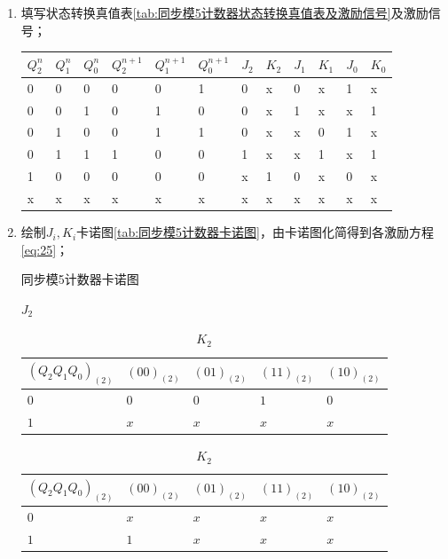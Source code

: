 \documentclass{ctexrep}
\begin{document}
\begin{enumerate}
	\item 填写状态转换真值表\ref{tab:同步模5计数器状态转换真值表及激励信号}及激励信号；

		\begin{table}[htbp]
			\centering
			\caption{同步模5计数器状态转换真值表及激励信号}
			\label{tab:同步模5计数器状态转换真值表及激励信号}
			\begin{longtabu}to
				\toprule
				$ Q^n_2 $ & $ Q^n_1 $ & $ Q^n_0 $ & $ Q^{n+1}_2 $ & $ Q^{n+1}_1 $ & $ Q^{n+1}_0 $ & $ J_2 $ & $ K_2 $ & $ J_1 $ & $ K_1 $ & $ J_0 $ & $ K_0 $ \\
				 & 0 & 0 & 0 & 0 & 1 & 0 & x & 0 & x & 1 & x\\
				0 & 0 & 1 & 0 & 1 & 0 & 0 & x & 1 & x & x & 1\\
				0 & 1 & 0 & 0 & 1 & 1 & 0 & x & x & 0 & 1 & x\\
				0 & 1 & 1 & 1 & 0 & 0 & 1 & x & x & 1 & x & 1\\
				1 & 0 & 0 & 0 & 0 & 0 & x & 1 & 0 & x & 0 & x\\
				x & x & x & x & x & x & x & x & x & x & x & x\\
				\bottomrule
			\end{longtabu}
		\end{table}

	\item 绘制$ J_i,K_i $卡诺图\ref{tab:同步模5计数器卡诺图}，由卡诺图化简得到各激励方程\ref{eq:25}；

		\begin{table}[htbp]
			\centering
			\caption{同步模5计数器卡诺图}
			\label{tab:同步模5计数器卡诺图}
			\begin{subtable}[htbp]{.45\linewidth}
				\centering
				\caption{$ J_2 $}
				\label{tab:J2}
				\begin{tabu}to
					$(Q_2Q_1Q_0)_{(2)}$& $(00)_{(2)}$ & $(01)_{(2)}$ & $(11)_{(2)}$ & $(10)_{(2)}$ \\
					\hline
					$0$ & $0$ & $0$ & $1$ & $0$ \\
					$1$ & $x$ & $x$ & $x$ & $x$ \\
				\end{tabu}
			\end{subtable}
			\quad
			\begin{subtable}[htbp]{.45\linewidth}
				\centering
				\caption{$ K_2 $}
				\label{tab:K2}
				\begin{tabu}to
					$(Q_2Q_1Q_0)_{(2)}$& $(00)_{(2)}$ & $(01)_{(2)}$ & $(11)_{(2)}$ & $(10)_{(2)}$ \\
					\hline
					$0$ & $x$ & $x$ & $x$ & $x$ \\
					$1$ & $1$ & $x$ & $x$ & $x$ \\
				\end{tabu}
			\end{subtable}


\end{table}
\end{enumerate}
\end{document}
